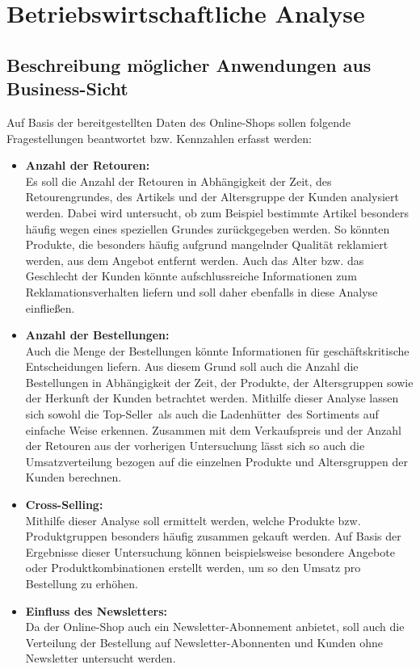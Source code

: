 \section{Betriebswirtschaftliche Analyse}
\subsection{Beschreibung möglicher Anwendungen aus Business-Sicht}

Auf Basis der bereitgestellten Daten des Online-Shops sollen folgende Fragestellungen beantwortet bzw. Kennzahlen erfasst werden:
\begin{itemize}
 	\item \textbf{Anzahl der Retouren:}\\
 	Es soll die Anzahl der Retouren in Abhängigkeit der Zeit, des Retourengrundes, des Artikels und der Altersgruppe der Kunden analysiert werden. Dabei wird untersucht, ob zum Beispiel bestimmte Artikel besonders häufig wegen eines speziellen Grundes zurückgegeben werden. So könnten Produkte, die besonders häufig aufgrund mangelnder Qualität reklamiert werden, aus dem Angebot entfernt werden. Auch das Alter bzw. das Geschlecht der Kunden könnte aufschlussreiche Informationen zum Reklamationsverhalten liefern und soll daher ebenfalls in diese Analyse einfließen. 
 
 	\item \textbf{Anzahl der Bestellungen:}\\ 
	Auch die Menge der Bestellungen könnte Informationen für geschäftskritische Entscheidungen liefern. Aus diesem Grund soll auch die Anzahl die Bestellungen in Abhängigkeit der Zeit, der Produkte, der Altersgruppen sowie der Herkunft der Kunden betrachtet werden. Mithilfe dieser Analyse lassen sich sowohl die \glqq Top-Seller\grqq ~als auch die \glqq Ladenhütter\grqq ~des Sortiments auf einfache Weise erkennen. Zusammen mit dem Verkaufspreis und der Anzahl der Retouren aus der vorherigen Untersuchung lässt sich so auch die Umsatzverteilung bezogen auf die einzelnen Produkte und Altersgruppen der Kunden berechnen. 
 
 	\item \textbf{Cross-Selling:}\\
 	Mithilfe dieser Analyse soll ermittelt werden, welche Produkte bzw. Produktgruppen besonders häufig zusammen gekauft werden. Auf Basis der Ergebnisse dieser Untersuchung können beispielsweise besondere Angebote oder Produktkombinationen erstellt werden, um so den Umsatz pro Bestellung zu erhöhen.
 	
 	\item \textbf{Einfluss des Newsletters:}\\
 	Da der Online-Shop auch ein Newsletter-Abonnement anbietet, soll auch die Verteilung der Bestellung auf Newsletter-Abonnenten und Kunden ohne Newsletter untersucht werden. 
 
\end{itemize}
 
